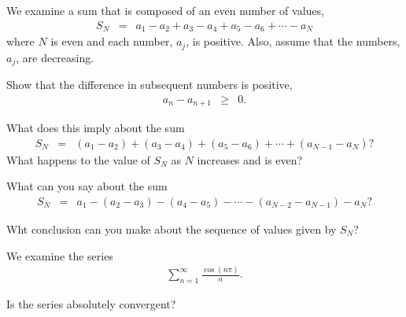 \begin{problem}
  \item We examine a sum that is composed of an even number of values,
  \begin{eqnarray*}
    S_N & = & a_1 - a_2 + a_3 - a_4 + a_5 - a_6 + \cdots - a_N
  \end{eqnarray*}
  where $N$ is even and each number, $a_j$, is positive.
  Also, assume that the numbers, $a_j$, are decreasing.
  \begin{subproblem}
    \item Show that the difference in subsequent numbers is positive,
    \begin{eqnarray*}
      a_{n} - a_{n+1} & \geq & 0.
    \end{eqnarray*}
    \vfill

    \item What does this imply about the sum
    \begin{eqnarray*}
      S_N & = & (a_1 - a_2) + (a_3 - a_4) + (a_5 - a_6) + \cdots + (a_{N-1} - a_N)?
    \end{eqnarray*}
    What happens to the value of $S_N$ as $N$ increases and is even?
    \vfill

    \item What can you say about the sum
    \begin{eqnarray*}
      S_N & = & a_1 - (a_2 - a_3) - (a_4 - a_5)  - \cdots - (a_{N-2} - a_{N-1}) - a_N?
    \end{eqnarray*}
    \vfill

    \item %
      Wht conclusion can you make about the sequence of values given by $S_N$?
      \vfill

  \end{subproblem}

  \clearpage

  \item We examine the series
  \begin{eqnarray*}
    \sum^\infty_{n=1} \frac{\cos(n\pi)}{n}.
  \end{eqnarray*}
  \begin{subproblem}
    \item Is the series absolutely convergent?
      \vfill


\end{subproblem}
\end{problem}
